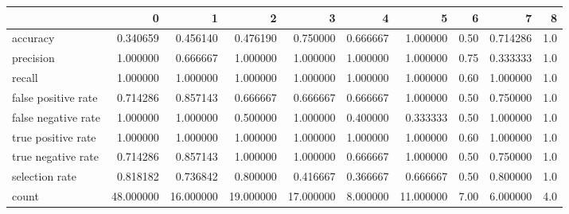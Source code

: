 \begin{tabular}{lrrrrrrrrr}
\toprule
{} &          0 &          1 &          2 &          3 &         4 &          5 &     6 &         7 &    8 \\
\midrule
accuracy            &   0.340659 &   0.456140 &   0.476190 &   0.750000 &  0.666667 &   1.000000 &  0.50 &  0.714286 &  1.0 \\
precision           &   1.000000 &   0.666667 &   1.000000 &   1.000000 &  1.000000 &   1.000000 &  0.75 &  0.333333 &  1.0 \\
recall              &   1.000000 &   1.000000 &   1.000000 &   1.000000 &  1.000000 &   1.000000 &  0.60 &  1.000000 &  1.0 \\
false positive rate &   0.714286 &   0.857143 &   0.666667 &   0.666667 &  0.666667 &   1.000000 &  0.50 &  0.750000 &  1.0 \\
false negative rate &   1.000000 &   1.000000 &   0.500000 &   1.000000 &  0.400000 &   0.333333 &  0.50 &  1.000000 &  1.0 \\
true positive rate  &   1.000000 &   1.000000 &   1.000000 &   1.000000 &  1.000000 &   1.000000 &  0.60 &  1.000000 &  1.0 \\
true negative rate  &   0.714286 &   0.857143 &   1.000000 &   1.000000 &  0.666667 &   1.000000 &  0.50 &  0.750000 &  1.0 \\
selection rate      &   0.818182 &   0.736842 &   0.800000 &   0.416667 &  0.366667 &   0.666667 &  0.50 &  0.800000 &  1.0 \\
count               &  48.000000 &  16.000000 &  19.000000 &  17.000000 &  8.000000 &  11.000000 &  7.00 &  6.000000 &  4.0 \\
\bottomrule
\end{tabular}
